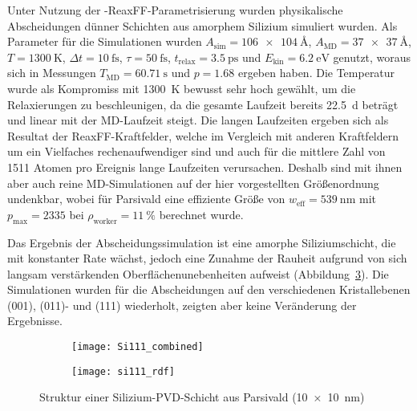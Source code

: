 Unter Nutzung der -ReaxFF-Parametrisierung wurden physikalische Abscheidungen dünner Schichten aus amorphem Silizium simuliert wurden.
Als Parameter für die Simulationen wurden $A_\text{sim} = \SI{106x104}{\angstrom}$, $A_\text{MD} = \SI{37x37}{\angstrom}$, $T = \SI{1300}{\kelvin}$, $\Delta t = \SI{10}{\femto\second}$, $\tau = \SI{50}{\femto\second}$, $t_\text{relax} = \SI{3.5}{\pico\second}$ und $E_\text{kin} = \SI{6.2}{\electronvolt}$ genutzt, woraus sich in Messungen $T_\text{MD} = \SI{60.71}{\second}$ und $p = \num{1.68}$ ergeben haben.
Die Temperatur wurde als Kompromiss mit \SI{1300}{\kelvin} bewusst sehr hoch gewählt, um die Relaxierungen zu beschleunigen, da die gesamte Laufzeit bereits \SI{22.5}{\day} beträgt und linear mit der MD-Laufzeit steigt.
Die langen Laufzeiten ergeben sich als Resultat der ReaxFF-Kraftfelder, welche im Vergleich mit anderen Kraftfeldern um ein Vielfaches rechenaufwendiger sind und auch für die mittlere Zahl von \num{1511} Atomen pro Ereignis lange Laufzeiten verursachen.
Deshalb sind mit ihnen aber auch reine MD-Simulationen auf der hier vorgestellten Größenordnung undenkbar, wobei für Parsivald eine effiziente Größe von $w_\text{eff} = \SI{539}{\nano\meter}$ mit $p_\text{max} = 2335$ bei $\rho_\text{worker} = \SI{11}{\percent}$ berechnet wurde.

Das Ergebnis der Abscheidungssimulation ist eine amorphe Siliziumschicht, die mit konstanter Rate wächst, jedoch eine Zunahme der Rauheit aufgrund von sich langsam verstärkenden Oberflächenunebenheiten aufweist (Abbildung~\ref{fig:siliconresults}).
Die Simulationen wurden für die Abscheidungen auf den verschiedenen Kristallebenen (001), (011)- und (111) wiederholt, zeigten aber keine Veränderung der Ergebnisse.

\begin{figure}[thp]
  \captionsetup[subfigure]{singlelinecheck=false}
  \def\subfigwidth{0.48\textwidth}
  \begin{subfigure}[t]{\subfigwidth}
    \texttt{[image: Si111\_combined]}
    \label{fig:siliconresults-a}
  \end{subfigure}
  \hfill
  \begin{subfigure}[t]{\subfigwidth}
    \texttt{[image: si111\_rdf]}
    \label{fig:siliconresults-b}
  \end{subfigure}
  \caption[Struktur einer Silizium-PVD-Schicht aus Parsivald]{
    Struktur einer Silizium-PVD-Schicht aus Parsivald (\SI{10x10}{\nano\meter})
  }
  \label{fig:siliconresults}
\end{figure}

